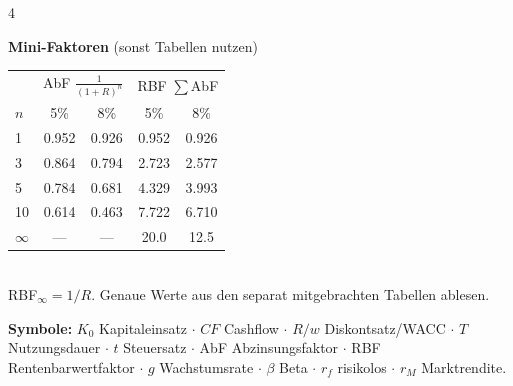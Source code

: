 \documentclass[10pt,a4paper,landscape]{extarticle}
\begin{document}
\begin{multicols}{4}
\begin{tcolorbox}[colback=cBox,colframe=cA,boxrule=0.35pt,left=3pt,right=3pt,top=2.5pt,bottom=2.5pt,arc=1pt]
\textbf{Mini-Faktoren} (sonst Tabellen nutzen)\\[2pt]
\renewcommand{\arraystretch}{1.15}
\begin{tabular}{@{}l|cc|cc@{}}
 & \multicolumn{2}{c|}{AbF $\tfrac{1}{(1{+}R)^n}$} & \multicolumn{2}{c}{RBF $\sum$AbF}\\
$n$ & 5\% & 8\% & 5\% & 8\%\\\hline
1 & 0.952 & 0.926 & 0.952 & 0.926\\
3 & 0.864 & 0.794 & 2.723 & 2.577\\
5 & 0.784 & 0.681 & 4.329 & 3.993\\
10 & 0.614 & 0.463 & 7.722 & 6.710\\
$\infty$ & — & — & 20.0 & 12.5\\
\end{tabular}\\[2pt]
\footnotesize RBF$_\infty=1/R$. Genaue Werte aus den separat mitgebrachten Tabellen ablesen.
\end{tcolorbox}

\textbf{\color{cA}Symbole:} $K_0$ Kapitaleinsatz $\cdot$ $CF$ Cashflow $\cdot$ $R/w$ Diskontsatz/WACC $\cdot$ $T$ Nutzungsdauer $\cdot$ $t$ Steuersatz $\cdot$ AbF Abzinsungsfaktor $\cdot$ RBF Rentenbarwertfaktor $\cdot$ $g$ Wachstumsrate $\cdot$ $\beta$ Beta $\cdot$ $r_f$ risikolos $\cdot$ $r_M$ Marktrendite.

\end{multicols}
\end{document}
